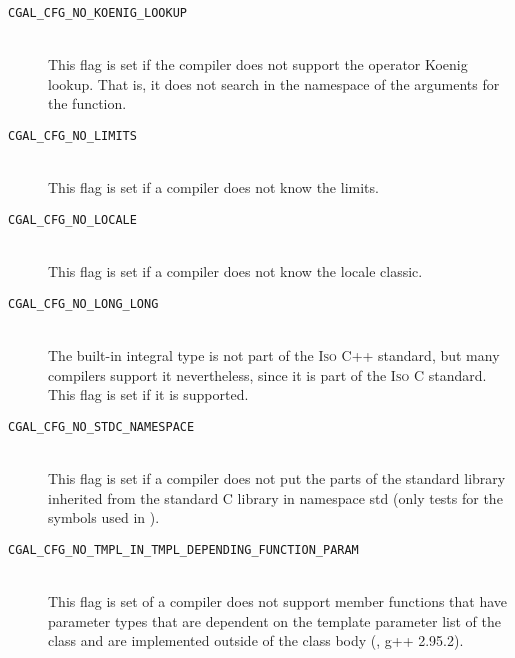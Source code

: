 \begin{description}
\item[{\tt CGAL\_CFG\_NO\_KOENIG\_LOOKUP}]~\\
  This flag is set if the compiler does not support the operator
  Koenig lookup. That is, it does not search in the namespace of the
  arguments for the function.
 
\item[{\tt CGAL\_CFG\_NO\_LIMITS}]~\\
  This flag is set if a compiler does not know the limits.

\item[{\tt CGAL\_CFG\_NO\_LOCALE}]~\\
  This flag is set if a compiler does not know the locale classic. 

\item[{\tt CGAL\_CFG\_NO\_LONG\_LONG}]~\\
  The  built-in integral type is not part of the
  \textsc{Iso} C++ standard, but many compilers support it
  nevertheless, since it is part of the \textsc{Iso} C standard. This
  flag is set if it is supported.
  
 
\item[{\tt CGAL\_CFG\_NO\_STDC\_NAMESPACE}]~\\ 
  This flag is set if a compiler does not put the parts of the
  standard library inherited from the standard C library in namespace
  {\ccFont std} (only tests for the symbols used in \cgal).
 
\item[{\tt CGAL\_CFG\_NO\_TMPL\_IN\_TMPL\_DEPENDING\_FUNCTION\_PARAM}]~\\
  This flag is set of a compiler does not support member functions
  that have parameter types that are dependent on the template
  parameter list of the class and are implemented outside of the class
  body (\eg, g++ 2.95.2).
  

\end{description}
